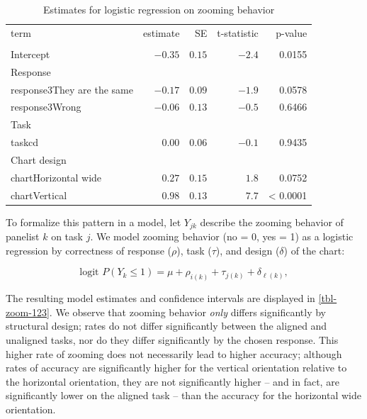 \documentclass[
]{jds}
\begin{document}
\hypertarget{tbl-zoom-123}{}
\begin{longtable}{lrrrr}
\caption{\label{tbl-zoom-123}Coefficients for logistic regression of zooming by task }\tabularnewline

\caption*{
{\large Estimates for logistic regression on zooming behavior}
} \\ 
\toprule
term & estimate & SE & t-statistic & p-value \\ 
\midrule
\multicolumn{5}{l}{} \\ 
\midrule
Intercept & $-0.35$ & $0.15$ & $-2.4$ & 0.0155 \\ 
\midrule
\multicolumn{5}{l}{Response} \\ 
\midrule
response3They are the same & $-0.17$ & $0.09$ & $-1.9$ & 0.0578 \\ 
response3Wrong & $-0.06$ & $0.13$ & $-0.5$ & 0.6466 \\ 
\midrule
\multicolumn{5}{l}{Task} \\ 
\midrule
taskcd & $0.00$ & $0.06$ & $-0.1$ & 0.9435 \\ 
\midrule
\multicolumn{5}{l}{Chart design} \\ 
\midrule
chartHorizontal wide & $0.27$ & $0.15$ & $1.8$ & 0.0752 \\ 
chartVertical & $0.98$ & $0.13$ & $7.7$ & < 0.0001 \\ 
\bottomrule
\end{longtable}

To formalize this pattern in a model, let \(Y_{jk}\) describe the
zooming behavior of panelist \(k\) on task \(j\). We model zooming
behavior (no = 0, yes = 1) as a logistic regression by correctness of
response (\(\rho\)), task (\(\tau\)), and design (\(\delta\)) of the
chart:

\begin{equation}
\text{logit } P(Y_k \le 1) = \mu + \rho_{i(k)} + \tau_{j(k)} + \delta_{\ell(k)},
\end{equation}

The resulting model estimates and confidence intervals are displayed in
\autoref{tbl-zoom-123}. We observe that zooming behavior \emph{only}
differs significantly by structural design; rates do not differ
significantly between the aligned and unaligned tasks, nor do they
differ significantly by the chosen response. This higher rate of zooming
does not necessarily lead to higher accuracy; although rates of accuracy
are significantly higher for the vertical orientation relative to the
horizontal orientation, they are not significantly higher -- and in
fact, are significantly lower on the aligned task -- than the accuracy
for the horizontal wide orientation.
\end{document}
